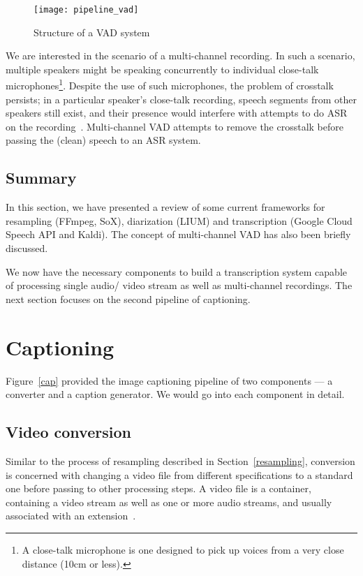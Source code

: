 \begin{figure}[h]
\begin{center}
    \texttt{[image: pipeline\_vad]}
    \caption{Structure of a VAD system}\label{vad}
\end{center}
\end{figure}

We are interested in the scenario of a multi-channel recording. In such a
scenario, multiple speakers might be speaking concurrently to individual
close-talk microphones\footnote{A close-talk microphone is one designed to pick
up voices from a very close distance (10cm or less).}. Despite the use of such
microphones, the problem of crosstalk persists; in a particular speaker's
close-talk recording, speech segments from other speakers still exist, and
their presence would interfere with attempts to do ASR on the
recording~\cite{vad-mc}. Multi-channel VAD attempts
to remove the crosstalk before passing the (clean) speech to an ASR system.

\subsection{Summary}

In this section, we have presented a review of some current frameworks for
resampling (FFmpeg, SoX), diarization (LIUM) and transcription (Google Cloud
Speech API and Kaldi). The concept of multi-channel VAD has also been briefly
discussed.

We now have the necessary components to build a transcription system capable
of processing single audio/ video stream as well as multi-channel recordings.
The next section focuses on the second pipeline of captioning.

\section{Captioning}

Figure~\ref{cap} provided the image captioning pipeline of two components ---
a converter and a caption generator. We would go into each component in detail.

\subsection{Video conversion}

Similar to the process of resampling described in Section~\ref{resampling},
conversion is concerned with changing a video file from different specifications
to a standard one before passing to other processing steps. A video file
is a container, containing a video stream as well as one or more audio
streams, and usually associated with an extension~\cite{vid}.

